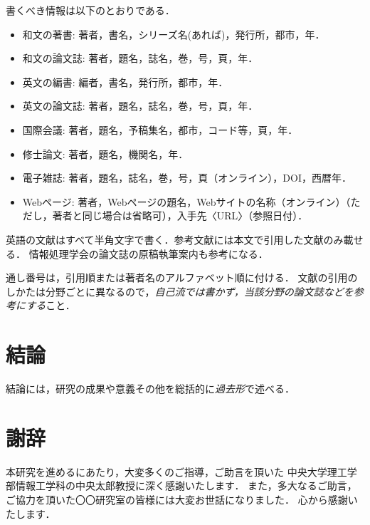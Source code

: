 \documentclass[a4j,12pt]{jreport}
\def\syaji{ \chapter*{謝辞} \addcontentsline{toc}{chapter}{謝辞}}
\begin{document}
書くべき情報は以下のとおりである．
\begin{itemize}
\item 和文の著書: 著者，書名，シリーズ名(あれば)，発行所，都市，年．
\item 和文の論文誌: 著者，題名，誌名，巻，号，頁，年．
\item 英文の編書: 編者，書名，発行所，都市，年．
\item 英文の論文誌: 著者，題名，誌名，巻，号，頁，年．
\item 国際会議: 著者，題名，予稿集名，都市，コード等，頁，年．
\item 修士論文: 著者，題名，機関名，年．
\item 電子雑誌: 著者，題名，誌名，巻，号，頁（オンライン），DOI，西暦年．
\item Webページ: 著者，Webページの題名，Webサイトの名称（オンライン）（ただし，著者と同じ場合は省略可），入手先〈URL〉（参照日付）．
\end{itemize}
英語の文献はすべて半角文字で書く．参考文献には本文で引用した文献のみ載せる．
情報処理学会の論文誌の原稿執筆案内\cite{IPSJ}も参考になる．

通し番号は，引用順または著者名のアルファベット順に付ける．
文献の引用のしかたは分野ごとに異なるので，{\em 自己流では書かず，当該分野の論文誌などを参考にする}こと．



\chapter{結論} \label{chapter:6}

結論には，研究の成果や意義その他を総括的に{\em 過去形}で述べる．



\syaji
\par
本研究を進めるにあたり，大変多くのご指導，ご助言を頂いた
中央大学理工学部情報工学科の中央太郎教授に深く感謝いたします．
また，多大なるご助言，ご協力を頂いた〇〇研究室の皆様には大変お世話になりました．
心から感謝いたします．
\end{document}
